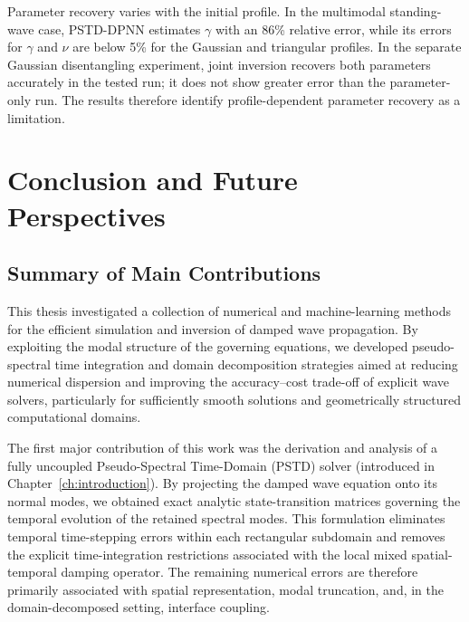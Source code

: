 \documentclass{Configuration_Files/PoliMi3i_thesis}
\newif\ifshowthesischanges
\DeclareRobustCommand{\thesischange}[2]{%
    \ifshowthesischanges
        \textcolor{#1}{#2}%
    \else
        #2%
    \fi
}
\def\thesischange#1#2{#2}%
\begin{document}
\thesischange{red}{Parameter recovery varies with the initial profile. In the multimodal standing-wave case, PSTD-DPNN estimates $\gamma$ with an 86\% relative error, while its errors for $\gamma$ and $\nu$ are below 5\% for the Gaussian and triangular profiles. In the separate Gaussian disentangling experiment, joint inversion recovers both parameters accurately in the tested run; it does not show greater error than the parameter-only run. The results therefore identify profile-dependent parameter recovery as a limitation.}

\chapter{Conclusion and Future Perspectives}
\label{ch:conclusion}

\section{Summary of Main Contributions}

\thesischange{red}{This thesis investigated a collection of numerical and machine-learning methods for the efficient simulation and inversion of damped wave propagation. By exploiting the modal structure of the governing equations, we developed pseudo-spectral time integration and domain decomposition strategies aimed at reducing numerical dispersion and improving the accuracy--cost trade-off of explicit wave solvers, particularly for sufficiently smooth solutions and geometrically structured computational domains.}

The first major contribution of this work was the derivation and analysis of a fully uncoupled Pseudo-Spectral Time-Domain (PSTD) solver (introduced in Chapter~\ref{ch:introduction}). By projecting the damped wave equation onto its normal modes, we obtained exact analytic state-transition matrices governing the temporal evolution of the retained spectral modes. \thesischange{red}{This formulation eliminates temporal time-stepping errors within each rectangular subdomain and removes the explicit time-integration restrictions associated with the local mixed spatial-temporal damping operator. The remaining numerical errors are therefore primarily associated with spatial representation, modal truncation, and, in the domain-decomposed setting, interface coupling.}
\end{document}
